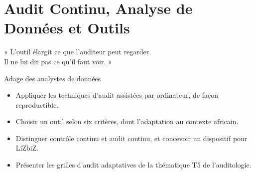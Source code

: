 
\chapter{Audit Continu, Analyse de Données et Outils}
\label{chap:audit-continu}

\epigraph{%
    « L'outil élargit ce que l'auditeur peut regarder.\\
    Il ne lui dit pas ce qu'il faut voir. »%
}{Adage des analystes de données}


\begin{boxobjectifs}
\begin{itemize}
    \item Appliquer les techniques d'audit assistées par ordinateur, de
          façon reproductible.
    \item Choisir un outil selon six critères, dont l'adaptation au
          contexte africain.
    \item Distinguer contrôle continu et audit continu, et concevoir un
          dispositif pour LiZbiZ.
    \item Présenter les grilles d'audit adaptatives de la thématique T5 de
          l'auditologie.
\end{itemize}
\end{boxobjectifs}

